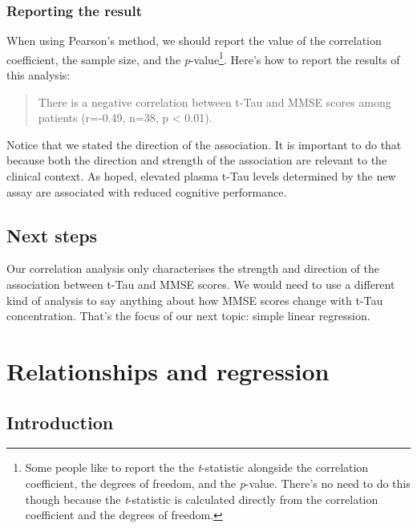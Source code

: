 \documentclass[
]{book}
\begin{document}
\hypertarget{reporting-the-result}{%
\subsection{Reporting the result}\label{reporting-the-result}}

When using Pearson's method, we should report the value of the correlation coefficient, the sample size, and the \emph{p}-value\footnote{Some people like to report the the \emph{t}-statistic alongside the correlation coefficient, the degrees of freedom, and the \emph{p}-value. There's no need to do this though because the \emph{t}-statistic is calculated directly from the correlation coefficient and the degrees of freedom.}. Here's how to report the results of this analysis:

\begin{quote}
There is a negative correlation between t-Tau and MMSE scores among patients (r=-0.49, n=38, p \textless{} 0.01).
\end{quote}

Notice that we stated the direction of the association. It is important to do that because both the direction and strength of the association are relevant to the clinical context. As hoped, elevated plasma t-Tau levels determined by the new assay are associated with reduced cognitive performance.

\hypertarget{next-steps}{%
\section{Next steps}\label{next-steps}}

Our correlation analysis only characterises the strength and direction of the association between t-Tau and MMSE scores. We would need to use a different kind of analysis to say anything about how MMSE scores change with t-Tau concentration. That's the focus of our next topic: simple linear regression.

\hypertarget{relationships-and-regression}{%
\chapter{Relationships and regression}\label{relationships-and-regression}}

\hypertarget{introduction-1}{%
\section{Introduction}\label{introduction-1}}
\end{document}
